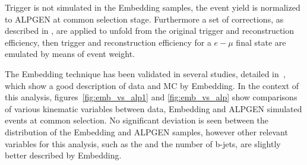 

Trigger is not simulated in the Embedding samples, the event yield
is normalized to ALPGEN \Ztautau at common selection stage. Furthermore a set of corrections, as described in \cite{SMnew}, are
applied to unfold from the original \Zmumu trigger and reconstruction efficiency, then trigger and reconstruction efficiency 
for a $e-\mu$ final state are emulated by means of event weight.

The Embedding technique has been validated in several studies, detailed in~\cite{Embedding, SMnew}, which show a good description of 
data and \Ztautau MC by Embedding. In the context of this analysis, 
figures~\ref{fig:emb_vs_alp1} and \ref{fig:emb_vs_alp} show comparisons of various kinematic variables between
data, Embedding and ALPGEN \Ztautau simulated events at common selection. No significant deviation is seen 
between the \mmc distribution of the Embedding and ALPGEN samples, 
however other relevant variables for this analysis, such as the \MET 
and the number of b-jets, are slightly better described by Embedding. 

